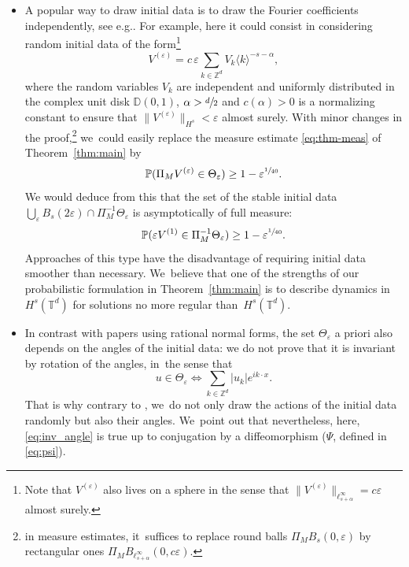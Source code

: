 \documentclass[10pt,a4paper]{amsart}
\providecommand{\eg}{e.g.}
\theoremstyle{plain}
\theoremstyle{definition}
\newcommand{\T}{\mathbb{T}}
\newcommand{\1}{\mathbf{1}}
\begin{document}
\begin{itemize}
\item A popular way to draw initial data is to draw the Fourier coefficients independently, see \eg \cite{Bou00,KillBill,KtA,LX23}. For example, here it could consist in considering random initial data of the form\footnote{Note that $V^{(\varepsilon)} $ also lives on a sphere in the sense that $\|V^{(\varepsilon)} \|_{\ell^\infty_{s+\alpha}} = c\varepsilon$ almost surely.}\vspace*{-3pt}
\[
V^{(\varepsilon)} = c \, \varepsilon \sum_{k\in \mathbb{Z}^d} V_k \langle k \rangle^{-s-\alpha},
\]
where the random variables $V_k$ are independent and uniformly distributed in the complex unit disk $\mathbb{D}(0,1)$, $\alpha>\sfrac{d}{2}$ and $c(\alpha)>0$ is a normalizing constant to ensure that $\| V^{(\varepsilon)} \|_{H^s}< \varepsilon$ almost surely. With minor changes in the proof,\footnote{in measure estimates, it~suffices to replace round balls $\Pi_M B_s(0,\varepsilon)$ by rectangular ones $\Pi_M B_{\ell^\infty_{s+\alpha}}(0,c\varepsilon)$.} we~could easily replace the measure estimate \eqref{eq:thm-meas} of Theorem~\ref{thm:main} by
\begin{equation}
\label{eq:loi_unif}
\mathbb{P}(\Pi_M V^{(\varepsilon)} \in \Theta_{\varepsilon}) \geq 1 -\varepsilon^{\sfrac{1}{40}}.
\end{equation}
We would deduce from this that the set of the stable initial data $\bigcup_{\varepsilon} B_{s}(2\varepsilon)\cap\Pi_{M}^{-1}\Theta_{\varepsilon}$ is asymptotically of full measure:
\[
\mathbb{P}(\varepsilon V^{(1)} \in \Pi_{M}^{-1}\Theta_{\varepsilon}) \geq 1 -\varepsilon^{\sfrac{1}{40}}.
\]
Approaches of this type have the disadvantage of requiring initial data smoother than necessary. We~believe that one of the strengths of our probabilistic formulation in Theorem~\ref{thm:main} is to describe dynamics in $H^{s}(\T^{d})$ for solutions no more regular than~$H^s(\T^{d})$.

\item In contrast with papers using rational normal forms, the set $\Theta_{\varepsilon}$ a priori also depends on the angles of the initial data: we do not prove that it is invariant by rotation of the angles, in~the sense that
\begin{equation}
\label{eq:inv_angle}
u \in \Theta_\varepsilon \iff \sum_{k\in \mathbb{Z}^d} |u_k| e^{ik\cdot x}.
\end{equation}
That is why contrary to \cite{KillBill,KtA,zhiqiang}, we~do not only draw the actions of the initial data randomly but also their angles. We~point out that nevertheless, here, \eqref{eq:inv_angle} is true up to conjugation by a diffeomorphism ($\Psi$, defined in \eqref{eq:psi}).
\end{itemize}
\end{document}
